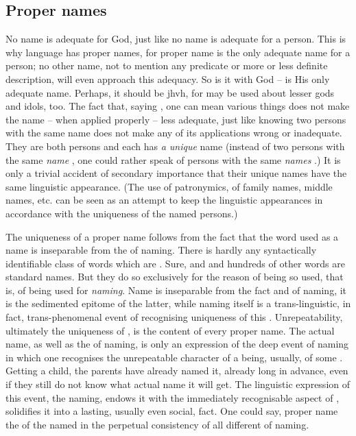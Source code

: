 \subsection{Proper names}
\pa No name is adequate for God, just like no name is adequate for a
person. This is why
language has proper names, for proper name is the only adequate name for a
person; no other name, not to mention any predicate or more or less definite
description, will even approach this adequacy. So is it with God --  is
His only adequate name. Perhaps, it should be {\sc jhvh}, for  may be
used about lesser gods and idols, too. The fact that, saying , one
can mean various things does not make the name -- when applied properly -- less
adequate, just like knowing two persons with the same name  does not
make any of its applications wrong or inadequate.  They are both persons and
each has {\em a unique} name (instead of two persons with the same {\em name}
, one could rather speak of persons with the same {\em names}
.) It is only a trivial accident of secondary importance that their
unique names have the same linguistic appearance. (The use of patronymics, of
family names, middle names, etc. can be seen as an attempt to keep the
linguistic appearances in accordance with the uniqueness of the named persons.)

The uniqueness of a proper name follows from the fact that the word used as a
name is inseparable from the  of naming. There is hardly any
syntactically identifiable class of words which are .  Sure,
 and  and hundreds of other words are standard names.  But
they do so exclusively for the reason of being so used, that is, of being used
for {\em naming}. Name is inseparable from the fact and  of naming, it
is the sedimented epitome of the latter, while naming itself is a
trans-linguistic, in fact, trans-phenomenal event of recognising uniqueness of
this . Unrepeatability, ultimately the uniqueness of
, is the  content of every proper name.  The actual
name, as well as the  of naming, is only an expression of the deep event
of naming in which one recognises the unrepeatable character of a being,
usually, of some . Getting a child, the parents have already named
it, already long in advance, even if they still do not know what actual name it
will get. The linguistic expression of this event, the  naming,
endows it with the immediately recognisable aspect of ,
solidifies it into a lasting, usually even social, fact. One could say, proper
name  the  of the named  in the perpetual
consistency of all different  of naming.

